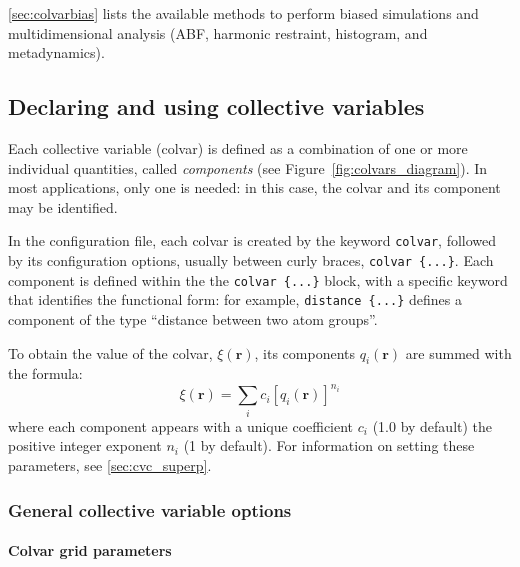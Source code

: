 \ref{sec:colvarbias} lists the available methods to perform biased
simulations and multidimensional analysis (ABF, harmonic restraint,
histogram, and metadynamics).


\subsection{Declaring and using collective variables}
\label{sec:colvar}

Each collective variable (colvar) is defined as a combination of one
or more individual quantities, called \emph{components} (see
Figure~\ref{fig:colvars_diagram}).  In most applications, only one is
needed: in this case, the colvar and its component may be identified.

In the configuration file, each colvar is created by the keyword
\texttt{colvar}, followed by its configuration options, usually
between curly braces, \texttt{colvar~\{...\}}.  Each component is
defined within the the \texttt{colvar~\{...\}} block, with a specific
keyword that identifies the functional form: for example,
\texttt{distance \{...\}} defines a component of the type ``distance
between two atom groups''.

To obtain the value of the colvar, $\xi(\mathbf{r})$, its components
$q_{i}(\mathbf{r})$ are summed with the formula:
\begin{equation}
  \label{eq:colvar_combination}
  \xi(\mathbf{r}) = \sum_{i} c_{i} [q_{i}(\mathbf{r})]^{n_{i}}
\end{equation}
where each component appears with a unique coefficient $c_{i}$ (1.0 by
default) the positive integer exponent $n_{i}$ (1 by default).
For information on setting these parameters, see \ref{sec:cvc_superp}.


\subsubsection{General collective variable options}

\paragraph*{Colvar grid parameters}


